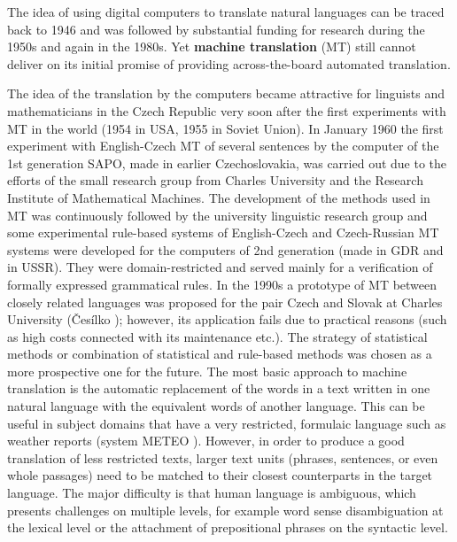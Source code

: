 \begin{multicols}{2}
The idea of using digital computers to translate natural languages can be traced back to 1946 and was followed by substantial funding for research during the 1950s and again in the 1980s. Yet \textbf{machine translation} (MT) still cannot deliver on its initial promise of providing across-the-board automated translation.


The idea of the translation by the computers became attractive for linguists and mathematicians in the Czech Republic very soon after the first experiments with MT in the world (1954 in USA, 1955 in Soviet Union). In January 1960 the first experiment with English-Czech MT of several sentences by the computer of the 1st generation SAPO, made in earlier Czechoslovakia, was carried out due to the efforts of the small research group from Charles University and the Research Institute of Mathematical Machines. The development of the methods used in MT was continuously followed by the university linguistic research group and some experimental rule-based systems of English-Czech and Czech-Russian MT systems were developed for the computers of 2nd generation (made in GDR and in USSR). They were domain-restricted and served mainly for a verification of formally expressed grammatical rules. In the 1990s a prototype of MT between closely related languages was proposed for the pair Czech and Slovak at Charles University (Česílko \cite{Note18}); however, its application fails due to practical reasons (such as high costs connected with its maintenance etc.). The strategy of statistical methods or combination of statistical and rule-based methods was chosen as a more prospective one for the future.
The most basic approach to machine translation is the automatic replacement of the words in a text written in one natural language with the equivalent words of another language. This can be useful in subject domains that have a very restricted, formulaic language such as weather reports (system METEO \cite{Note19}). However, in order to produce a good translation of less restricted texts, larger text units (phrases, sentences, or even whole passages) need to be matched to their closest counterparts in the target language. The major difficulty is that human language is ambiguous, which presents challenges on multiple levels, for example word sense disambiguation at the lexical level or the attachment of prepositional phrases on the syntactic level.


\end{multicols}
